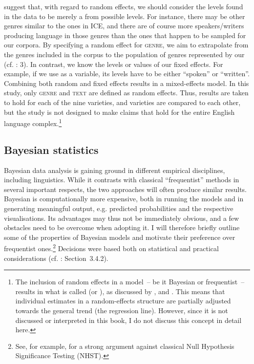 \citet[3]{SpeelmanHeylenGeeraerts2018} suggest that, with regard to random effects, we should consider the levels found in the data to be merely a  from possible levels. For instance, there may be other genres similar to the ones in ICE, and there are of course more speakers/writers producing language in those genres than the ones that happen to be sampled for our corpora. By specifying a random effect for \textsc{genre}, we aim to extrapolate from the genres included in the corpus to the population of genres represented by our  (cf. \citealt{SpeelmanHeylenGeeraerts2018}: 3). In contrast, we know the levels or values of our fixed effects. For example, if we use  as a variable, its levels have to be either “spoken” or “written”. Combining both random and fixed effects results in a mixed-effects model. In this study, only \textsc{genre} and \textsc{text} are defined as random effects. Thus, results are taken to hold for each of the nine varieties, and varieties are compared to each other, but the study is not designed to make claims that hold for the entire English language complex.\footnote{The inclusion of random effects in a model~– be it Bayesian or frequentist~– results in what is called \textit{} (or \textit{}), as discussed by \citet[245–249]{Kruschke2015}, \citet[252–259]{GelmanHill2007} and \citet[275–278]{Baayen2008}. This means that individual estimates in a random-effects structure are partially adjusted towards the general trend (the regression line). However, since it is not discussed or interpreted in this book, I do not discuss this concept in detail here.}

\subsection{\label{bkm:Ref38459573}Bayesian statistics}\label{sec:6.3.2}

Bayesian data analysis is gaining ground in different empirical disciplines, including linguistics. While it contrasts with classical “frequentist” methods in several important respects, the two approaches will often produce similar results. Bayesian  is computationally more expensive, both in running the models and in generating meaningful output, e.g. predicted probabilities and the respective visualisations. Its advantages may thus not be immediately obvious, and a few obstacles need to be overcome when adopting it. I will therefore briefly outline some of the properties of Bayesian models and motivate their preference over frequentist ones.\footnote{See, for example, \citet[chapter 11]{Kruschke2015} for a strong argument against classical Null Hypothesis Significance Testing (NHST).} Decisions were based both on statistical and practical considerations (cf. \citealt{Sönning2020}: Section~3.4.2).

